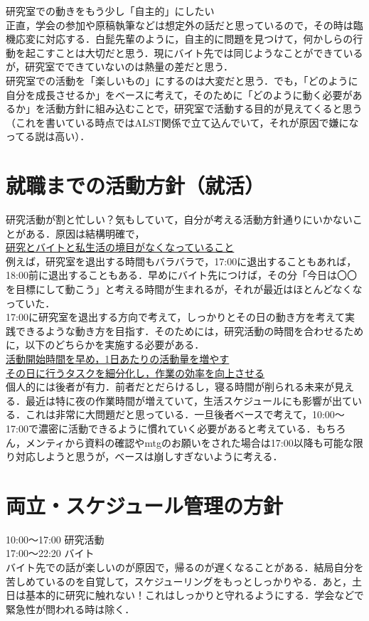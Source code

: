 \documentclass[a4paper,12pt]{ltjsarticle}
\begin{document}
  研究室での動きをもう少し「自主的」にしたい\\

  正直，学会の参加や原稿執筆などは想定外の話だと思っているので，その時は臨機応変に対応する．白髭先輩のように，自主的に問題を見つけて，何かしらの行動を起こすことは大切だと思う．現にバイト先では同じようなことができているが，研究室でできていないのは熱量の差だと思う．\\

  研究室での活動を「楽しいもの」にするのは大変だと思う．でも，「どのように自分を成長させるか」をベースに考えて，そのために「どのように動く必要があるか」を活動方針に組み込むことで，研究室で活動する目的が見えてくると思う（これを書いている時点ではALST関係で立て込んでいて，それが原因で嫌になってる説は高い）．\\

  \clearpage

  \section{就職までの活動方針（就活）}
  研究活動が割と忙しい？気もしていて，自分が考える活動方針通りにいかないことがある．原因は結構明確で，\\

  \underline{研究とバイトと私生活の境目がなくなっていること}\\

  例えば，研究室を退出する時間もバラバラで，17:00に退出することもあれば，18:00前に退出することもある．早めにバイト先につけば，その分「今日は〇〇を目標にして動こう」と考える時間が生まれるが，それが最近はほとんどなくなっていた．\\

  17:00に研究室を退出する方向で考えて，しっかりとその日の動き方を考えて実践できるような動き方を目指す．そのためには，研究活動の時間を合わせるために，以下のどちらかを実施する必要がある．\\

  \underline{活動開始時間を早め，1日あたりの活動量を増やす}\\
  
  \underline{その日に行うタスクを細分化し，作業の効率を向上させる}\\

  個人的には後者が有力．前者だとだらけるし，寝る時間が削られる未来が見える．最近は特に夜の作業時間が増えていて，生活スケジュールにも影響が出ている．これは非常に大問題だと思っている．一旦後者ベースで考えて，10:00〜17:00で濃密に活動できるように慣れていく必要があると考えている．もちろん，メンティから資料の確認やmtgのお願いをされた場合は17:00以降も可能な限り対応しようと思うが，ベースは崩しすぎないように考える．\\

  \clearpage

  \section{両立・スケジュール管理の方針}
  10:00〜17:00 研究活動\\

  17:00〜22:20 バイト\\

  バイト先での話が楽しいのが原因で，帰るのが遅くなることがある．結局自分を苦しめているのを自覚して，スケジューリングをもっとしっかりやる．あと，土日は基本的に研究に触れない！これはしっかりと守れるようにする．学会などで緊急性が問われる時は除く．

  \clearpage
\end{document}
